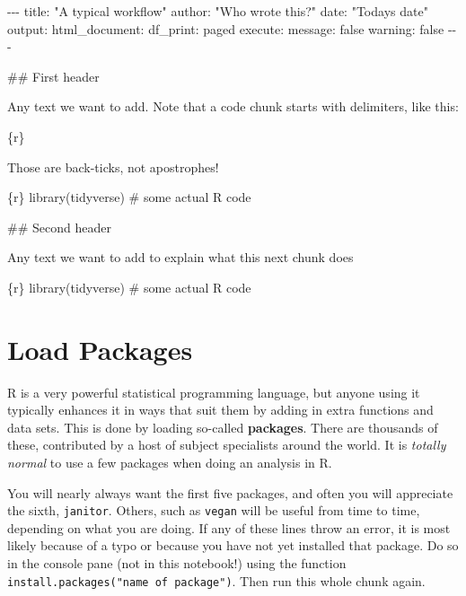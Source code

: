 \documentclass[
  letterpaper,
  DIV=11,
  numbers=noendperiod]{scrreprt}
\newenvironment{Shaded}{\begin{snugshade}}{\end{snugshade}}
\newcommand{\AnnotationTok}[1]{\textcolor[rgb]{0.37,0.37,0.37}{#1}}
\newcommand{\CommentTok}[1]{\textcolor[rgb]{0.37,0.37,0.37}{#1}}
\newcommand{\FunctionTok}[1]{\textcolor[rgb]{0.28,0.35,0.67}{#1}}
\newcommand{\InformationTok}[1]{\textcolor[rgb]{0.37,0.37,0.37}{#1}}
\newcommand{\NormalTok}[1]{\textcolor[rgb]{0.00,0.23,0.31}{#1}}
\begin{document}
\begin{Shaded}
\begin{Highlighting}[]
\CommentTok{{-}{-}{-}}
\AnnotationTok{title:}\CommentTok{ "A typical workflow"}
\AnnotationTok{author:}\CommentTok{ "Who wrote this?"}
\AnnotationTok{date:}\CommentTok{ "Today\textquotesingle{}s date"}
\AnnotationTok{output:}
\CommentTok{  html\_document:}
\CommentTok{    df\_print: paged}
\AnnotationTok{execute:}
\CommentTok{  message: false}
\CommentTok{  warning: false}
\CommentTok{{-}{-}{-}}

\FunctionTok{\#\# First header}

\NormalTok{Any text we want to add. Note that a code chunk starts with delimiters, like this:}

\InformationTok{\textasciigrave{}\textasciigrave{}\textasciigrave{}\{r\}}

\InformationTok{\textasciigrave{}\textasciigrave{}\textasciigrave{}}


\NormalTok{Those are back{-}ticks, not apostrophes!}

\InformationTok{\textasciigrave{}\textasciigrave{}\textasciigrave{}\{r\}}
\InformationTok{library(tidyverse) \# some actual R code}
\InformationTok{\textasciigrave{}\textasciigrave{}\textasciigrave{}}

\FunctionTok{\#\# Second header}

\NormalTok{Any text we want to add to explain what this next chunk does}

\InformationTok{\textasciigrave{}\textasciigrave{}\textasciigrave{}\{r\}}
\InformationTok{library(tidyverse) \# some actual R code}
\InformationTok{\textasciigrave{}\textasciigrave{}\textasciigrave{}}
\end{Highlighting}
\end{Shaded}

\section{Load Packages}\label{load-packages}

R is a very powerful statistical programming language, but anyone using
it typically enhances it in ways that suit them by adding in extra
functions and data sets. This is done by loading so-called
\textbf{packages}. There are thousands of these, contributed by a host
of subject specialists around the world. It is \emph{totally normal} to
use a few packages when doing an analysis in R.

You will nearly always want the first five packages, and often you will
appreciate the sixth, \texttt{janitor}. Others, such as \texttt{vegan}
will be useful from time to time, depending on what you are doing. If
any of these lines throw an error, it is most likely because of a typo
or because you have not yet installed that package. Do so in the console
pane (not in this notebook!) using the function
\texttt{install.packages("name\ of\ package")}. Then run this whole
chunk again.
\end{document}
